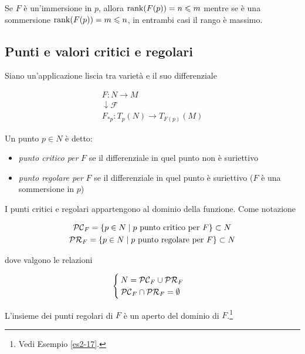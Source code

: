 \begin{remark}
	Se $ F $ è un'immersione in $ p $, allora $ \rank(F(p)) = n \leqslant m $ mentre se è una sommersione $ \rank(F(p)) = m \leqslant n $, in entrambi casi il rango è massimo.
\end{remark}

\subsection{Punti e valori critici e regolari}

Siano un'applicazione liscia tra varietà e il suo differenziale

\begin{gather}
	F : N \to M\\
	\downarrow \mathcal{F} \nonumber\\
	F_{*p} : T_{p}(N) \to T_{F(p)}(M)
\end{gather}

Un punto $ p \in N $ è detto:

\begin{itemize}
	\item \textit{punto critico per} $ F $ se il differenziale in quel punto non è suriettivo
	
	\item \textit{punto regolare per} $ F $ se il differenziale in quel punto è suriettivo ($ F $ è una sommersione in $ p $)
\end{itemize}

I punti critici e regolari appartengono al dominio della funzione. Come notazione

\begin{gather}
	\mathcal{PC}_{F} = \{ p \in N \mid p \text{ punto critico per } F \} \subset N\\
	\mathcal{PR}_{F} = \{ p \in N \mid p \text{ punto regolare per } F \} \subset N
\end{gather}

dove valgono le relazioni

\begin{equation}
	\begin{cases}
		N = \mathcal{PC}_{F} \cup \mathcal{PR}_{F}\\
		\mathcal{PC}_{F} \cap \mathcal{PR}_{F} = \emptyset
	\end{cases}
\end{equation}

\begin{remark}
	L'insieme dei punti regolari di $ F $ è un aperto del dominio di $ F $.\footnote{%
		Vedi Esempio \ref{es2-17}.%
	}
\end{remark}

